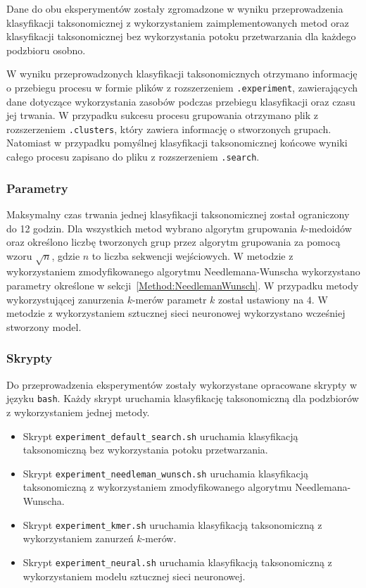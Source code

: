         Dane do obu eksperymentów zostały zgromadzone w wyniku przeprowadzenia klasyfikacji taksonomicznej z wykorzystaniem zaimplementowanych metod oraz klasyfikacji taksonomicznej bez wykorzystania potoku przetwarzania dla każdego podzbioru osobno.

        W wyniku przeprowadzonych klasyfikacji taksonomicznych otrzymano informację o przebiegu procesu w formie plików z rozszerzeniem \texttt{.experiment}, zawierających dane dotyczące wykorzystania zasobów podczas przebiegu klasyfikacji oraz czasu jej trwania. W przypadku sukcesu procesu grupowania otrzymano plik z rozszerzeniem \texttt{.clusters}, który zawiera informację o stworzonych grupach. Natomiast w przypadku pomyślnej klasyfikacji taksonomicznej końcowe wyniki całego procesu zapisano do pliku z rozszerzeniem \texttt{.search}.

        \subsubsection{Parametry}

            Maksymalny czas trwania jednej klasyfikacji taksonomicznej został ograniczony do 12 godzin. Dla wszystkich metod wybrano algorytm grupowania $k$-medoidów oraz określono liczbę tworzonych grup przez algorytm grupowania za pomocą wzoru $\sqrt{n}$, gdzie $n$ to liczba sekwencji wejściowych. W metodzie z wykorzystaniem zmodyfikowanego algorytmu Needlemana-Wunscha wykorzystano parametry określone w sekcji~\ref{Method:NeedlemanWunsch}. W przypadku metody wykorzystującej zanurzenia $k$-merów parametr $k$ został ustawiony na $4$. W metodzie z wykorzystaniem sztucznej sieci neuronowej wykorzystano wcześniej stworzony model.

        \subsubsection{Skrypty}

            Do przeprowadzenia eksperymentów zostały wykorzystane opracowane skrypty w języku \texttt{bash}. Każdy skrypt uruchamia klasyfikację taksonomiczną dla podzbiorów z wykorzystaniem jednej metody.

            \begin{itemize}
                \item {
                    Skrypt \texttt{experiment\_default\_search.sh} uruchamia klasyfikacją taksonomiczną bez wykorzystania potoku przetwarzania.
                }
                \item {
                    Skrypt \texttt{experiment\_needleman\_wunsch.sh} uruchamia klasyfikacją taksonomiczną z wykorzystaniem zmodyfikowanego algorytmu Needlemana-Wunscha.
                }
                \item {
                    Skrypt \texttt{experiment\_kmer.sh} uruchamia klasyfikacją taksonomiczną z wykorzystaniem zanurzeń $k$-merów.
                }
                \item {
                    Skrypt \texttt{experiment\_neural.sh} uruchamia klasyfikacją taksonomiczną z wykorzystaniem modelu sztucznej sieci neuronowej.
                }
            \end{itemize}

